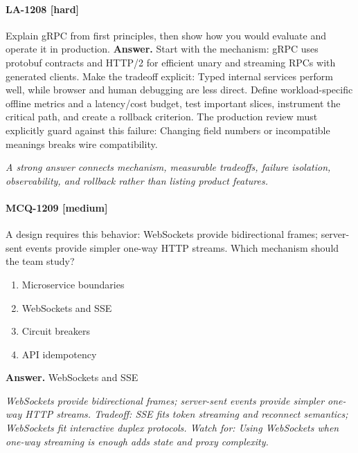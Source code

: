 \paragraph{LA-1208 [hard]} Explain gRPC from first principles, then show how you would evaluate and operate it in production.
\noindent\textbf{Answer.} Start with the mechanism: gRPC uses protobuf contracts and HTTP/2 for efficient unary and streaming RPCs with generated clients. Make the tradeoff explicit: Typed internal services perform well, while browser and human debugging are less direct. Define workload-specific offline metrics and a latency/cost budget, test important slices, instrument the critical path, and create a rollback criterion. The production review must explicitly guard against this failure: Changing field numbers or incompatible meanings breaks wire compatibility.
\par\textit{A strong answer connects mechanism, measurable tradeoffs, failure isolation, observability, and rollback rather than listing product features.}
\paragraph{MCQ-1209 [medium]} A design requires this behavior: WebSockets provide bidirectional frames; server-sent events provide simpler one-way HTTP streams. Which mechanism should the team study?
\begin{enumerate}[label=\Alph*.]
\item Microservice boundaries
\item WebSockets and SSE
\item Circuit breakers
\item API idempotency
\end{enumerate}
\noindent\textbf{Answer.} WebSockets and SSE
\par\textit{WebSockets provide bidirectional frames; server-sent events provide simpler one-way HTTP streams. Tradeoff: SSE fits token streaming and reconnect semantics; WebSockets fit interactive duplex protocols. Watch for: Using WebSockets when one-way streaming is enough adds state and proxy complexity.}

